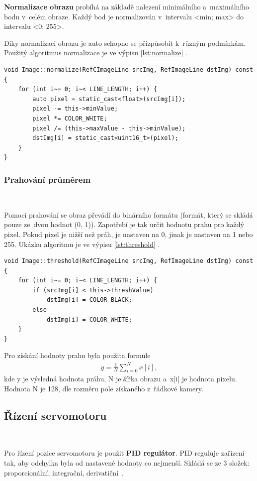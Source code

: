 \textbf{Normalizace obrazu} probíhá na základě nalezení minimálního a~maximálního
bodu v~celém obraze. Každý bod je normalizován v~intervalu <min; max> do intervalu
<0; 255>.

Díky normalizaci obrazu je auto schopno se přizpůsobit k~různým  podmínkám. Použitý
algoritmus normalizace je ve výpisu \ref{lst:normalize} \cite{robot}.
\begin{lstlisting}[caption = Normalizace obrazu, label = lst:normalize]
void Image::normalize(RefCImageLine srcImg, RefImageLine dstImg) const {
    for (int i~= 0; i~< LINE_LENGTH; i++) {
        auto pixel = static_cast<float>(srcImg[i]);
        pixel -= this->minValue;
        pixel *= COLOR_WHITE;
        pixel /= (this->maxValue - this->minValue);
        dstImg[i] = static_cast<uint16_t>(pixel);
    }
}
\end{lstlisting}

\subsubsection*{Prahování průměrem}\

Pomocí prahování se obraz převádí do binárního formátu (formát, který se skládá
pouze ze~dvou hodnot (0, 1)). Zapotřebí je tak určit hodnotu prahu pro každý pixel.
Pokud pixel je nižší než práh, je nastaven na 0, jinak je nastaven na 1 nebo 255.
Ukázku algoritmu je ve výpisu \ref{lst:threshold} \cite{robot}.
\begin{lstlisting}[caption = Prahování průměrem, label = lst:threshold]
void Image::threshold(RefCImageLine srcImg, RefImageLine dstImg) const {
    for (int i~= 0; i~< LINE_LENGTH; i++) {
        if (srcImg[i] < this->threshValue)
            dstImg[i] = COLOR_BLACK;
        else
            dstImg[i] = COLOR_WHITE;
    }
}
\end{lstlisting}

Pro získání hodnoty prahu byla použita formule
\begin{align}
y = \frac{1}{N} \sum_{i = 0}^{N}x[i],
\end{align}
kde y je výsledná hodnota práhu, N je šířka obrazu a~x[i] je hodnota pixelu. Hodnota N je 128, dle rozměru pole získaného z~řádkové kamery. 

\subsection{Řízení servomotoru}\
\label{sec:servocontrol}

Pro řízení pozice servomotoru je použit \textbf{PID regulátor}. PID reguluje
zařízení tak, aby odchylka byla od nastavené hodnoty co nejmenší. Skládá se ze 3
složek: proporcionální, integrační, derivatiční~\cite{PID}.

